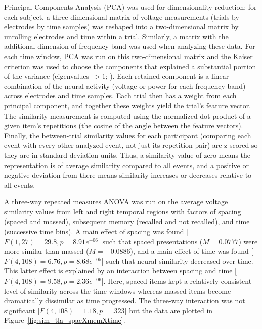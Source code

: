 Principal Components Analysis (PCA) was used for dimensionality reduction; for each subject, a three-dimensional matrix of voltage measurements (trials by electrodes by time samples) was reshaped into a two-dimensional matrix by unrolling electrodes and time within a trial.  Similarly, a matrix with the additional dimension of frequency band was used when analyzing these data.  For each time window, PCA was run on this two-dimensional matrix and the Kaiser criterion was used to choose the components that explained a substantial portion of the variance (eigenvalues~$>1$; ).
Each retained component is a linear combination of the neural activity (voltage or power for each frequency band) across electrodes and time samples.  Each trial then has a weight from each principal component, and together these weights yield the trial's feature vector.  The similarity measurement is computed using the normalized dot product of a given item's repetitions (the cosine of the angle between the feature vectors).  Finally, the between-trial similarity values for each participant (comparing each event with every other analyzed event, not just its repetition pair) are z-scored so they are in standard deviation units.  Thus, a similarity value of zero means the representation is of average similarity compared to all events, and a positive or negative deviation from there means similarity increases or decreases relative to all events.




A three-way repeated measures ANOVA was run on the average voltage similarity values from left and right temporal regions with factors of spacing (spaced and massed), subsequent memory (recalled and not recalled), and time (successive time bins).  A main effect of spacing was found [$F(1,27)=29.8, p=8.91e^{-06}$] such that spaced presentations ($M=0.0777$) were more similar than massed ($M=-0.0886$), and a main effect of time was found [$F(4,108)=6.76, p=8.68e^{-05}$] such that neural similarity decreased over time.
This latter effect is explained by an interaction between spacing and time [$F(4,108)=9.58, p=2.36e^{-06}$].  Here, spaced items kept a relatively consistent level of similarity across the time windows whereas massed items become dramatically dissimilar as time progressed.  The three-way interaction was not significant [$F(4,108)=1.18, p=.323$] but the data are plotted in Figure~\ref{fig:sim_tla_spacXmemXtime}.


